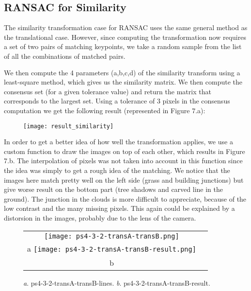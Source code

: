 \documentclass[a4paper,11pt]{article}
\begin{document}
\subsection{RANSAC for Similarity}

The similarity transformation case for RANSAC uses the same general method as the translational case.
However, since computing the transformation now requires a set of two pairs of matching keypoints, we take a random sample from the list of all the combinations of matched pairs.
 
We then compute the 4 parameters (a,b,c,d) of the similarity transform using a least-square method, which gives us the similarity matrix. We then compute the consensus set (for a given tolerance value) and return the matrix that corresponds to the largest set.
Using a tolerance of 3 pixels in the consensus computation we get the following result (represented in Figure 7.a):
 \begin{figure}[H]
\begin{center}
	\texttt{[image: result\_similarity]}
\end{center}
\end{figure}

In order to get a better idea of how well the transformation applies, we use a custom function to draw the images on top of each other, which results in Figure 7.b. The interpolation of pixels was not taken into account in this function since the idea was simply to get a rough idea of the matching.
We notice that the images here match pretty well on the left side (grass and building junctions) but give worse result on the bottom part (tree shadows and carved line in the ground). The junction in the clouds is more difficult to appreciate, because of the low contrast and the many missing pixels.
This again could be explained by a distorsion in the images, probably due to the lens of the camera.

 \begin{figure}[H]
\begin{center}
\begin{tabular}{cc}
	\texttt{[image: ps4-3-2-transA-transB.png]}\\
	a
	\texttt{[image: ps4-3-2-transA-transB-result.png]}\\
	b
\end{tabular}
\end{center}
\caption{ 
\textit{a}. ps4-3-2-transA-transB-lines.  \textit{b}. ps4-3-2-transA-transB-result.  }
\label{ps-4-3-2}
\end{figure}


\lstset{style=mystyle}

\end{document}
